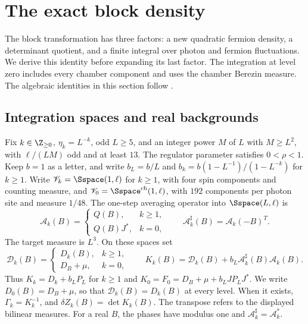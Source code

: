 \section{The exact block density}\label{sec:rg-step}

The block transformation has three factors: a new quadratic
fermion density, a determinant quotient, and a finite integral
over photon and fermion fluctuations. We derive this identity
before expanding its last factor. The integration at level
zero includes every chamber component and uses the chamber
Berezin measure. The algebraic identities in this section follow
\cite[\S13.1--13.3]{QED3Master}.

\subsection{Integration spaces and real backgrounds}
\label{subsec:rg-step-real-background}

Fix $k\in\Z_{\ge0}$, $\eta_k=L^{-k}$, odd $L\ge5$, and an
integer power $M$ of $L$ with $M\ge L^2$, with $\ell/(LM)$ odd and at least $13$.
The regulator parameter satisfies $0<\rho<1$.
Keep $b=1$ as a letter, and write
$b_L=b/L$ and
$b_k=b(1-L^{-1})/(1-L^{-k})$ for $k\ge1$.
Write $\mathscr V_k=\Sspace(1,\ell)$ for $k\ge1$, with
four spin components and counting measure, and
$\mathscr V_0=\Sspace^{\mathrm{ch}}(1,\ell)$, with
$192$ components per photon site and measure $1/48$.
The one-step averaging operator into $\Sspace(L,\ell)$ is
\[
 \mathcal A_k(B)=
 \begin{cases}
 Q(B),&k\ge1,\\
 Q(B)J^*,&k=0,
 \end{cases}
 \qquad
 \mathcal A_k^\sharp(B)=\mathcal A_k(-B)^T.
\]
The target measure is $L^3$. On these spaces set
\begin{equation}\label{eq:rg-step-quadratic-operators}
 \mathcal D_k(B)=
 \begin{cases}D_k(B),&k\ge1,\\D_B+\mu,&k=0,\end{cases}
 \qquad
 K_k(B)=\mathcal D_k(B)+b_L\mathcal A_k^\sharp(B)\mathcal A_k(B).
\end{equation}
Thus $K_k=D_k+b_LP_L$ for $k\ge1$ and
$K_0=F_0=D_B+\mu+b_LJP_LJ^*$.
We write $D_0(B)=D_B+\mu$, so that
$\mathcal D_k(B)=D_k(B)$ at every level.
When it exists, $\Gamma_k=K_k^{-1}$, and
$\delta Z_k(B)=\det K_k(B)$.
The transpose refers to the displayed bilinear measures.
For a real $B$, the phases have modulus one and
$\mathcal A_k^\sharp=\mathcal A_k^*$.

